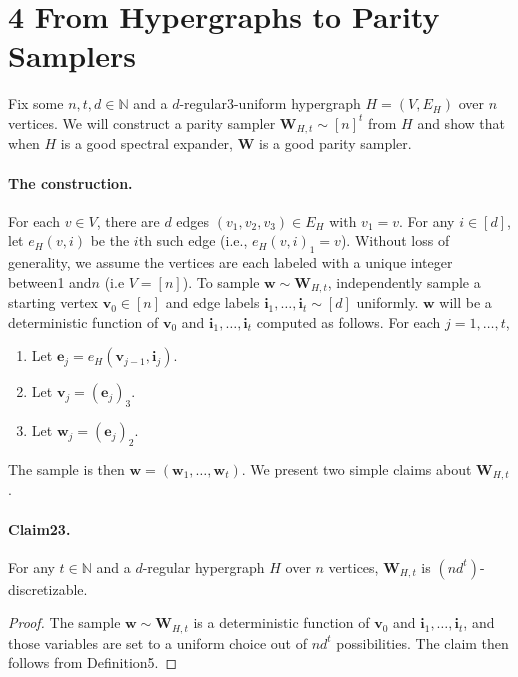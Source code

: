 \section*{4 From Hypergraphs to Parity Samplers}
Fix some $n,t,d\in\mathbb N$ and a $d$-regular3-uniform hypergraph $H=(V,E_H)$ over $n$ vertices. We will construct a parity sampler $\mathbf W_{H,t}\sim[n]^t$ from $H$ and show that when $H$ is a good spectral expander, $\mathbf W$ is a good parity sampler.
\paragraph{The construction.}
For each $v\in V$, there are $d$ edges $(v_1,v_2,v_3)\in E_H$ with $v_1=v$. For any $i\in[d]$, let $e_H(v,i)$ be the $i$th such edge (i.e., $e_H(v,i)_1=v$). Without loss of generality, we assume the vertices are each labeled with a unique integer between1 and$n$ (i.e $V=[n]$).
To sample $\mathbf w\sim\mathbf W_{H,t}$, independently sample a starting vertex $\mathbf v_0\in[n]$ and edge labels $\mathbf i_1,\ldots,\mathbf i_t\sim[d]$ uniformly. $\mathbf w$ will be a deterministic function of $\mathbf v_0$ and $\mathbf i_1,\ldots,\mathbf i_t$ computed as follows. For each $j=1,\ldots,t$,
\begin{enumerate}
\item Let $\mathbf e_j=e_H(\mathbf v_{j-1},\mathbf i_j)$.
\item Let $\mathbf v_j=(\mathbf e_j)_3$.
\item Let $\mathbf w_j=(\mathbf e_j)_2$.
\end{enumerate}
The sample is then $\mathbf w=(\mathbf w_1,\ldots,\mathbf w_t)$.
We present two simple claims about $\mathbf W_{H,t}$.
\paragraph{Claim23.} For any $t\in\mathbb N$ and a $d$-regular hypergraph $H$ over $n$ vertices, $\mathbf W_{H,t}$ is $(nd^t)$-discretizable.
\begin{proof}
The sample $\mathbf w\sim\mathbf W_{H,t}$ is a deterministic function of $\mathbf v_0$ and $\mathbf i_1,\ldots,\mathbf i_t$, and those variables are set to a uniform choice out of $nd^t$ possibilities. The claim then follows from Definition5.
\end{proof}
